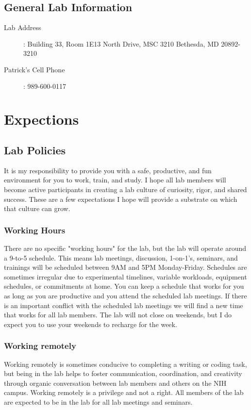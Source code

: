 \documentclass[10pt, a4paper, twocolumn]{article} %
\begin{document}
\subsection{General Lab Information}
\begin{description}
\item [Lab Address]: \newline Building 33, Room 1E13  North Drive, MSC 3210 \newline Bethesda, MD 20892-3210
\item [Patrick's Cell Phone]: 989-600-0117
\end{description}

\section{Expections}
\subsection{Lab Policies}
It is my responsibility to provide you with a safe, productive, and fun environment for you to work, train, and study. I hope all lab members will become active participants in creating a lab culture of curiosity, rigor, and shared success. These are a few expectations I hope will provide a substrate on which that culture can grow.
\subsubsection{Working Hours}
There are no specific "working hours" for the lab, but the lab will operate around a 9-to-5 schedule. This means lab meetings, discussion, 1-on-1's, seminars, and trainings will be scheduled between 9AM and 5PM Monday-Friday. Schedules are sometimes irregular due to experimental timelines, variable workloads, equipment schedules, or commitments at home. You can keep a schedule that works for you as long as you are productive and you attend the scheduled lab meetings. If there is an important conflict with the scheduled lab meetings we will find a new time that works for all lab members. The lab will not close on weekends, but I do expect you to use your weekends to recharge for the week.
\subsubsection{Working remotely} Working remotely is sometimes conducive to completing a writing or coding task, but being in the lab helps to foster communication, coordination, and creativity through organic conversation between lab members and others on the NIH campus. Working remotely is a privilege and not a right. All members of the lab are expected to be in the lab for all lab meetings and seminars.
\end{document}

